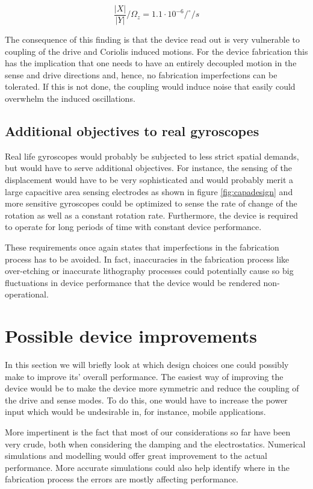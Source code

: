\documentclass[12pt,a4paper,titlepage]{article}
\begin{document}
\begin{spacing}{1.1}
\begin{equation}
\dfrac{\lvert X \rvert}{\lvert Y \rvert}/\Omega_z = 1.1\cdot 10^{-6} /^\circ/s
\label{eq:displacementcomp}
\end{equation}

The consequence of this finding is that the device read out is very vulnerable to coupling of the drive and Coriolis induced motions. For the device fabrication this has the implication that one needs to have an entirely decoupled motion in the sense and drive directions and, hence, no fabrication imperfections can be tolerated. If this is not done, the coupling would induce noise that easily could overwhelm the induced oscillations.

\subsection{Additional objectives to real gyroscopes}
Real life gyroscopes would probably be subjected to less strict spatial demands, but would have to serve additional objectives. For instance, the sensing of the displacement would have to be very sophisticated and would probably merit a large capacitive area sensing electrodes as shown in figure \ref{fig:capadesign} and more sensitive gyroscopes could be optimized to sense the rate of change of the rotation as well as a constant rotation rate. Furthermore, the device is required to operate for long periods of time with constant device performance.

These requirements once again states that imperfections in the fabrication process has to be avoided. In fact, inaccuracies in the fabrication process like over-etching or inaccurate lithography processes could potentially cause so big fluctuations in device performance that the device would be rendered non-operational.

\section{Possible device improvements}
In this section we will briefly look at which design choices one could possibly make to improve its' overall performance. The easiest way of improving the device would be to make the device more symmetric and reduce the coupling of the drive and sense modes. To do this, one would have to increase the power input which would be undesirable in, for instance, mobile applications. 

More impertinent is the fact that most of our considerations so far have been very crude, both when considering the damping and the electrostatics. Numerical simulations and modelling would offer great improvement to the actual performance. More accurate simulations could also help identify where in the fabrication process the errors are mostly affecting performance.


\end{spacing}
\end{document}
